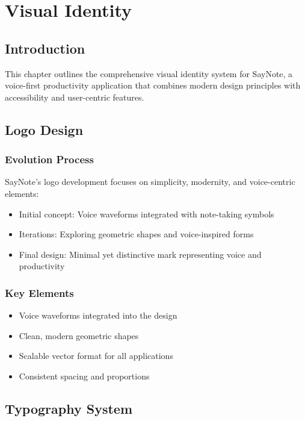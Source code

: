 \chapter{Visual Identity}

\section{Introduction}
This chapter outlines the comprehensive visual identity system for SayNote, a voice-first productivity application that combines modern design principles with accessibility and user-centric features.

\section{Logo Design}
\subsection{Evolution Process}
SayNote's logo development focuses on simplicity, modernity, and voice-centric elements:
\begin{itemize}
    \item Initial concept: Voice waveforms integrated with note-taking symbols
    \item Iterations: Exploring geometric shapes and voice-inspired forms
    \item Final design: Minimal yet distinctive mark representing voice and productivity
\end{itemize}

\subsection{Key Elements}
\begin{itemize}
    \item Voice waveforms integrated into the design
    \item Clean, modern geometric shapes
    \item Scalable vector format for all applications
    \item Consistent spacing and proportions
\end{itemize}

\section{Typography System}
